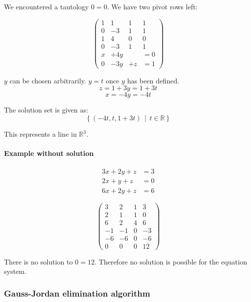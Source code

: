 \documentclass[a4paper,landscape,twocolumn]{article}
\newcommand\setdef[2]{\left\{#1\,\middle|\,#2\right\}}
\begin{document}
We encountered a tautology $0 = 0$. We have two pivot rows left:

\[
  \left(\begin{array}{ccc|c}
     1 &  1 &  1 & 1 \\
     0 & -3 &  1 & 1 \\
   \hline
     1 &  4 &  0 & 0 \\
     0 & -3 &  1 & 1 \\
   \hline
     x & +4y &    &= 0 \\
     0 & -3y & +z &= 1
  \end{array}\right)
\]

$y$ can be chosen arbitrarily. $y = t$ once $y$ has been defined.
\[ z = 1 + 3y = 1 + 3t \]
\[ x = -4y = -4t \]

The solution set is given as:
\[ \setdef{(-4t, t, 1 + 3t)}{t \in \mathbb{R}} \]

This represents a line in $\mathbb{R}^3$.

\paragraph{Example without solution}
\begin{align*}
  3x + 2y + z & =3 \\
  2x +  y + z &= 0 \\
  6x + 2y + z &= 6
\end{align*}

\[
  \left(\begin{array}{ccc|c}
      3 &  2 &  1 & 3 \\
      2 &  1 &  1 & 0 \\
      6 &  2 &  4 & 6 \\
   \hline
     -1 & -1 &  0 & -3 \\
     -6 & -6 &  0 & -6 \\
   \hline
     0 &   0 &  0 & 12
  \end{array}\right)
\]

There is no solution to $0 = 12$. Therefore no solution is possible for the equation system.

\subsubsection{Gauss-Jordan elimination algorithm}
\end{document}
